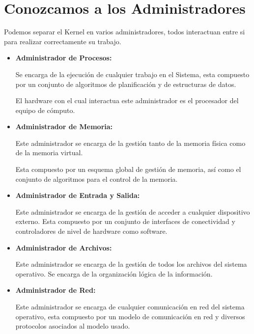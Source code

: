 \documentclass[12pt, fleqn]{report}                             %
\begin{document}
        \clearpage
        \section{Conozcamos a los Administradores}

            Podemos separar el Kernel en varios administradores, todos interactuan entre si
            para realizar correctamente su trabajo.

            \begin{itemize}
                \item
                    \textbf{Administrador de Procesos:}

                    Se encarga de la ejecución de cualquier trabajo en el Sistema, esta
                    compuesto por un conjunto de algoritmos de planificación y de estructuras
                    de datos.

                    El hardware con el cual interactua este administrador es el procesador
                    del equipo de cómputo.

                \item
                    \textbf{Administrador de Memoria:}

                    Este administrador se encarga de la gestión tanto de la memoria física como
                    de la memoria virtual.

                    Esta compuesto por un esquema global de gestión de memoria, así como el
                    conjunto de algoritmos para el control de la memoria.


                \item
                    \textbf{Administrador de Entrada y Salida:}

                    Este administrador se encarga de la gestión de acceder a cualquier dispositivo
                    externo.
                    Esta compuesto por un conjunto de interfaces de conectividad y controladores
                    de nivel de hardware como software.


                \item
                    \textbf{Administrador de Archivos:}

                    Este administrador se encarga de la gestión de todos los archivos del
                    sistema operativo.
                    Se encarga de la organización lógica de la información.

                 \item
                    \textbf{Administrador de Red:}

                    Este administrador se encarga de cualquier comunicación en red del sistema
                    operativo, esta compuesto por un modelo de comunicación en red y diversos
                    protocolos asociados al modelo usado.

            \end{itemize}
\end{document}

